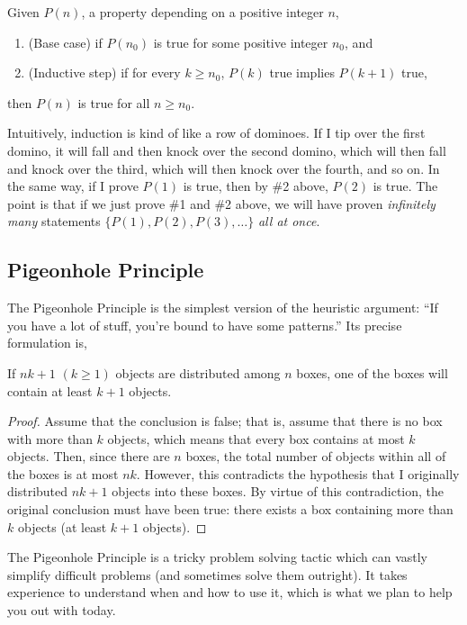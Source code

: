 \documentclass{article}
\begin{document}
\begin{theorem}
Given \(P(n)\), a property depending on a positive integer \(n\),
\begin{enumerate}
    \item (Base case) if \(P(n_0)\) is true for some positive integer \(n_0\), and
    \item (Inductive step) if for every \(k\geq n_0\), \(P(k)\) true implies \(P(k+1)\) true,
\end{enumerate}
then \(P(n)\) is true for all \(n\geq n_0\).
\end{theorem}
Intuitively, induction is kind of like a row of dominoes. If I tip over the first domino, it will fall and then knock over the second domino, which will then fall and knock over the third, which will then knock over the fourth, and so on. In the same way, if I prove $P(1)$ is true, then by \#2 above, $P(2)$ is true. The point is that if we just prove \#1 and \#2 above, we will have proven \emph{infinitely many} statements $\{P(1),P(2),P(3),\dots\}$ \emph{all at once}. 
\subsection{Pigeonhole Principle} 
The Pigeonhole Principle is the simplest version of the heuristic argument: ``If you have a lot of stuff, you're bound to have some patterns.'' Its precise formulation is, 
\begin{theorem}
If $nk+1$ $(k\geq 1)$ objects are distributed among $n$ boxes, one of the boxes will contain at least $k+1$ objects.
\end{theorem}
\begin{proof}
Assume that the conclusion is false; that is, assume that there is no box with more than $k$ objects, which means that every box contains at most $k$ objects. Then, since there are $n$ boxes, the total number of objects within all of the boxes is at most $nk$. However, this contradicts the hypothesis that I originally distributed $nk+1$ objects into these boxes. By virtue of this contradiction, the original conclusion must have been true: there exists a box containing more than $k$ objects (at least $k+1$ objects).
\end{proof}
The Pigeonhole Principle is a tricky problem solving tactic which can vastly simplify difficult problems (and sometimes solve them outright). It takes experience to understand when and how to use it, which is what we plan to help you out with today.
\end{document}
